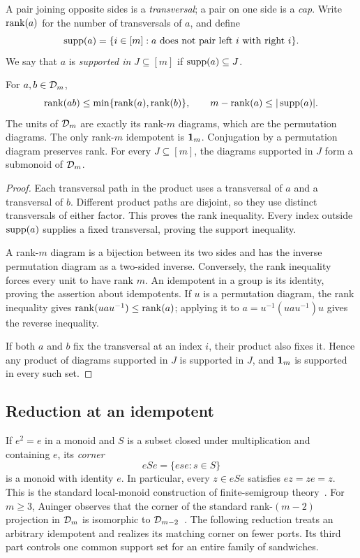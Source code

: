 A pair joining opposite sides is a \emph{transversal}; a pair on one
side is a \emph{cap}.  Write $\operatorname{rank}(a)$ for the number of transversals
of $a$, and define
\[
  \operatorname{supp}(a)=\{i\in[m]:
      \text{$a$ does not pair left $i$ with right $i$}\}.
\]
We say that $a$ is \emph{supported in} $J\subseteq[m]$ if
$\operatorname{supp}(a)\subseteq J$.

\begin{lemma}
\label{lem:rank-basic}
For $a,b\in\mathcal D_{m}$,
\[
  \operatorname{rank}(ab)\leq \min\{\operatorname{rank}(a),\operatorname{rank}(b)\},
  \qquad
  m-\operatorname{rank}(a)\leq |\operatorname{supp}(a)|.
\]
The units of $\mathcal D_{m}$ are exactly its rank-$m$ diagrams, which are the
permutation diagrams.  The only rank-$m$ idempotent is $\mathbf 1_m$.
Conjugation by a permutation diagram preserves rank.
For every $J\subseteq[m]$, the diagrams supported in $J$ form a
submonoid of $\mathcal D_{m}$.
\end{lemma}

\begin{proof}
Each transversal path in the product uses a transversal of $a$ and a
transversal of $b$.  Different product paths are disjoint, so they use
distinct transversals of either factor.  This proves the rank inequality.
Every index outside $\operatorname{supp}(a)$ supplies a fixed transversal, proving
the support inequality.

A rank-$m$ diagram is a bijection between its two sides and has the
inverse permutation diagram as a two-sided inverse.  Conversely, the
rank inequality forces every unit to have rank $m$.  An idempotent in
a group is its identity, proving the assertion about idempotents.
If $u$ is a permutation diagram, the rank inequality gives
$\operatorname{rank}(uau^{-1})\leq\operatorname{rank}(a)$; applying it to
$a=u^{-1}(uau^{-1})u$ gives the reverse inequality.

If both $a$ and $b$ fix the transversal at an index $i$, their product
also fixes it.  Hence any product of diagrams supported in $J$ is
supported in $J$, and $\mathbf 1_m$ is supported in every such set.
\end{proof}

\subsection{Reduction at an idempotent}

If $e^2=e$ in a monoid and $S$ is a subset closed under multiplication
and containing $e$, its \emph{corner}
\[
  eSe=\{ese:s\in S\}
\]
is a monoid with identity $e$.  In particular, every $z\in eSe$
satisfies $ez=ze=z$. This is the standard local-monoid construction
of finite-semigroup theory~\cite[Section~2.7]{Pin1997}.
For $m\ge3$, Auinger observes that the corner of the standard
rank-$(m-2)$ projection in $\mathcal D_{m}$ is isomorphic to
$\mathcal D_{m-2}$~\cite[Section~3]{Auinger2012}.
The following reduction treats an arbitrary idempotent and realizes its
matching corner on fewer ports. Its third part controls one common support
set for an entire family of sandwiches.

